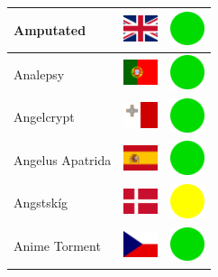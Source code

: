 \documentclass[12pt, a4paper, twoside]{report}
\begin{document}
\begin{center}
\begin{longtable}{|p{5cm}|p{2cm}|p{2cm}|}
Amputated & \includegraphics[width=1cm]{4x3/gb} & \includegraphics[width=1cm]{likes/y} \\ \hline
Analepsy & \includegraphics[width=1cm]{4x3/pt} & \includegraphics[width=1cm]{likes/y} \\ \hline
Angelcrypt & \includegraphics[width=1cm]{4x3/mt} & \includegraphics[width=1cm]{likes/y} \\ \hline
Angelus Apatrida & \includegraphics[width=1cm]{4x3/es} & \includegraphics[width=1cm]{likes/y} \\ \hline
Angstskíg & \includegraphics[width=1cm]{4x3/dk} & \includegraphics[width=1cm]{likes/m} \\ \hline
Anime Torment & \includegraphics[width=1cm]{4x3/cz} & \includegraphics[width=1cm]{likes/y} \\ \hline

\end{longtable}
\end{center}
\end{document}
